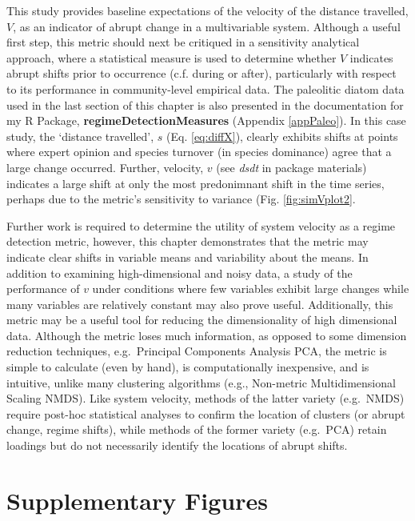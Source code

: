 \documentclass[12pt,twoside,openany]{reedthesis}
\begin{document}
This study provides baseline expectations of the velocity of the distance travelled, \(V\), as an indicator of abrupt change in a multivariable system. Although a useful first step, this metric should next be critiqued in a sensitivity analytical approach, where a statistical measure is used to determine whether \(V\) indicates abrupt shifts prior to occurrence (c.f. during or after), particularly with respect to its performance in community-level empirical data. The paleolitic diatom data used in the last section of this chapter is also presented in the documentation for my R Package, \textbf{regimeDetectionMeasures} (Appendix \ref{appPaleo}). In this case study, the `distance travelled', \(s\) (Eq. \eqref{eq:diffX}), clearly exhibits shifts at points where expert opinion and species turnover (in species dominance) agree that a large change occurred. Further, velocity, \(v\) (see \emph{dsdt} in package materials) indicates a large shift at only the most predonimnant shift in the time series, perhaps due to the metric's sensitivity to variance (Fig. \ref{fig:simVplot2}.

Further work is required to determine the utility of system velocity as a regime detection metric, however, this chapter demonstrates that the metric may indicate clear shifts in variable means and variability about the means. In addition to examining high-dimensional and noisy data, a study of the performance of \(v\) under conditions where few variables exhibit large changes while many variables are relatively constant may also prove useful. Additionally, this metric may be a useful tool for reducing the dimensionality of high dimensional data. Although the metric loses much information, as opposed to some dimension reduction techniques, e.g.~Principal Components Analysis PCA, the metric is simple to calculate (even by hand), is computationally inexpensive, and is intuitive, unlike many clustering algorithms (e.g., Non-metric Multidimensional Scaling NMDS). Like system velocity, methods of the latter variety (e.g.~NMDS) require post-hoc statistical analyses to confirm the location of clusters (or abrupt change, regime shifts), while methods of the former variety (e.g.~PCA) retain loadings but do not necessarily identify the locations of abrupt shifts.

\hypertarget{supplementary-figures}{%
\section{Supplementary Figures}\label{supplementary-figures}}
\end{document}
